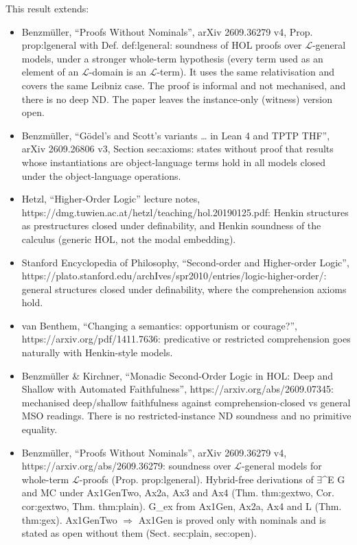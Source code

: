 \documentclass{article}
\begin{document}
This result extends:

\begin{itemize}
\item Benzmüller, ``Proofs Without Nominals'', arXiv 2609.36279 v4, Prop. prop:lgeneral with Def. def:lgeneral: soundness of HOL proofs over $\mathcal{L}$-general models, under a stronger whole-term hypothesis (every term used as an element of an $\mathcal{L}$-domain is an $\mathcal{L}$-term). It uses the same relativisation and covers the same Leibniz case. The proof is informal and not mechanised, and there is no deep ND. The paper leaves the instance-only (witness) version open.
\item Benzmüller, ``Gödel's and Scott's variants \ldots{} in Lean 4 and TPTP THF'', arXiv 2609.26806 v3, Section sec:axioms: states without proof that results whose instantiations are object-language terms hold in all models closed under the object-language operations.
\item Hetzl, ``Higher-Order Logic'' lecture notes, https://dmg.tuwien.ac.at/hetzl/teaching/hol.20190125.pdf: Henkin structures as prestructures closed under definability, and Henkin soundness of the calculus (generic HOL, not the modal embedding).
\item Stanford Encyclopedia of Philosophy, ``Second-order and Higher-order Logic'', https://plato.stanford.edu/archIves/spr2010/entries/logic-higher-order/: general structures closed under definability, where the comprehension axioms hold.
\item van Benthem, ``Changing a semantics: opportunism or courage?'', https://arxiv.org/pdf/1411.7636: predicative or restricted comprehension goes naturally with Henkin-style models.
\item Benzmüller \& Kirchner, ``Monadic Second-Order Logic in HOL: Deep and Shallow with Automated Faithfulness'', https://arxiv.org/abs/2609.07345: mechanised deep/shallow faithfulness against comprehension-closed vs general MSO readings. There is no restricted-instance ND soundness and no primitive equality.
\item Benzmüller, ``Proofs Without Nominals'', arXiv 2609.36279 v4, https://arxiv.org/abs/2609.36279: soundness over $\mathcal{L}$-general models for whole-term $\mathcal{L}$-proofs (Prop. prop:lgeneral). Hybrid-free derivations of $\exists$\textasciicircum{}E G and MC under Ax1GenTwo, Ax2a, Ax3 and Ax4 (Thm. thm:gextwo, Cor. cor:gextwo, Thm. thm:plain). G\_ex from Ax1Gen, Ax2a, Ax4 and L (Thm. thm:gex). Ax1GenTwo $\Rightarrow$ Ax1Gen is proved only with nominals and is stated as open without them (Sect. sec:plain, sec:open).

\end{itemize}
\end{document}
